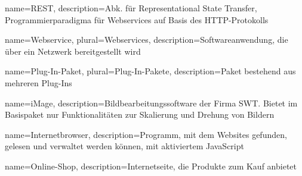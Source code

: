 %
%
\printglossaries
%
%
{
	name=REST,
	description={Abk. für Representational State Transfer, Programmierparadigma für \glspl{Webservice} auf Basis des HTTP-Protokolls}
}

{
	name=Webservice,
	plural=Webservices,
	description={Softwareanwendung, die über ein Netzwerk bereitgestellt wird}
}

{
	name=Plug-In-Paket,
	plural=Plug-In-Pakete,
	description={Paket bestehend aus mehreren \glspl{Plug-In}}
}

{
	name={iMage},
	description={Bildbearbeitungssoftware der Firma SWT. Bietet im Basispaket nur Funktionalitäten zur Skalierung und Drehung von Bildern}
}

{
	name={Internetbrowser},
	description={Programm, mit dem Websites gefunden, gelesen und verwaltet werden können, mit aktiviertem JavaScript}
}

{
	name={Online-Shop},
	description={Internetseite, die Produkte zum Kauf anbietet}
}